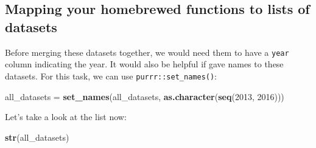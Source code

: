 \documentclass[]{gitbook}
\newenvironment{Shaded}{\begin{snugshade}}{\end{snugshade}}
\newcommand{\DecValTok}[1]{\textcolor[rgb]{0.00,0.00,0.81}{#1}}
\newcommand{\KeywordTok}[1]{\textcolor[rgb]{0.13,0.29,0.53}{\textbf{#1}}}
\newcommand{\NormalTok}[1]{#1}
\newcommand{\StringTok}[1]{\textcolor[rgb]{0.31,0.60,0.02}{#1}}
\theoremstyle{definition}
\theoremstyle{definition}
\theoremstyle{definition}
\theoremstyle{remark}
\begin{document}
\hypertarget{mapping-your-homebrewed-functions-to-lists-of-datasets}{%
\subsection{Mapping your homebrewed functions to lists of
datasets}\label{mapping-your-homebrewed-functions-to-lists-of-datasets}}

Before merging these datasets together, we would need them to have a
\texttt{year} column indicating the year. It would also be helpful if
gave names to these datasets. For this task, we can use
\texttt{purrr::set\_names()}:

\begin{Shaded}
\begin{Highlighting}[]
\NormalTok{all_datasets =}\StringTok{ }\KeywordTok{set_names}\NormalTok{(all_datasets, }\KeywordTok{as.character}\NormalTok{(}\KeywordTok{seq}\NormalTok{(}\DecValTok{2013}\NormalTok{, }\DecValTok{2016}\NormalTok{)))}
\end{Highlighting}
\end{Shaded}

Let's take a look at the list now:

\begin{Shaded}
\begin{Highlighting}[]
\KeywordTok{str}\NormalTok{(all_datasets)}
\end{Highlighting}
\end{Shaded}
\end{document}
